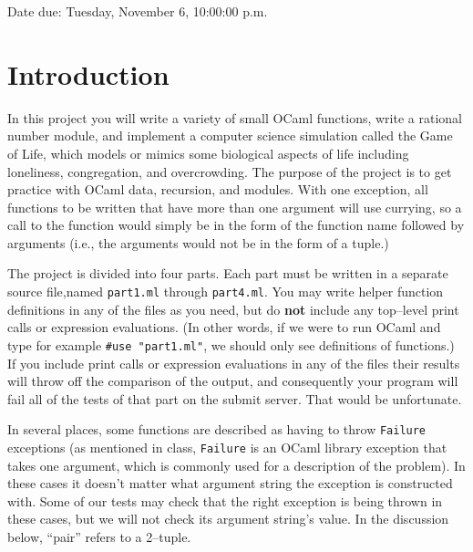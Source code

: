 \documentclass[11pt]{article}
\begin{document}

  \vspace{-3mm}

  \begin{centering}

    Date due: Tuesday, November 6, 10:00:00 p.m.

  \end{centering}

  \vspace{-6mm}


  \section{Introduction}

    In this project you will write a variety of small OCaml functions, write a
  rational number module, and implement a computer science simulation called
  the Game of Life, which models or mimics some biological aspects of life
  including loneliness, congregation, and overcrowding.  The purpose of the
  project is to get practice with OCaml data, recursion, and modules.  With
  one exception, all functions to be written that have more than one
  argument will use currying, so a call to the function would simply be in
  the form of the function name followed by arguments (i.e., the arguments
  would not be in the form of a tuple.)

    The project is divided into four parts.  Each part must be written in a
  separate source file,named \texttt{part1.ml} through \texttt{part4.ml}.
  You may write helper function definitions in any of the files as you need,
  but do \textbf{not} include any top--level print calls or expression
  evaluations.  (In other words, if we were to run OCaml and type for
  example \texttt{\#use "part1.ml"}, we should only see definitions of
  functions.)  If you include print calls or expression evaluations in any
  of the files their results will throw off the comparison of the output,
  and consequently your program will fail all of the tests of that part on
  the submit server.  That would be unfortunate.

    In several places, some functions are described as having to throw
  \texttt{Failure} exceptions (as mentioned in class, \texttt{Failure} is an
  OCaml library exception that takes one argument, which is commonly used
  for a description of the problem).  In these cases it doesn't matter what
  argument string the exception is constructed with.  Some of our tests may
  check that the right exception is being thrown in these cases, but we will
  not check its argument string's value.  In the discussion below, ``pair''
  refers to a 2--tuple.
\end{document}
